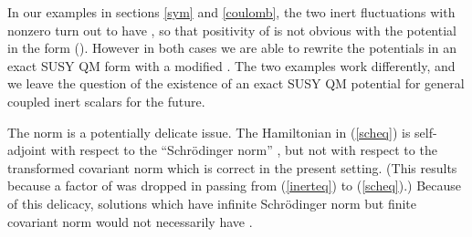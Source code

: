 \documentclass[a4paper,12pt]{article}
\begin{document}
In our examples in sections \ref{sym} and
\ref{coulomb}, the two inert fluctuations with nonzero \coordHE{}
turn out to have \coordHE{}, so that positivity of \coordHE{} is
not obvious with the potential in the form (\myHighlight{$\ref{schpot}$}\coordHE{}).  However
in both cases we are able to rewrite the potentials in an exact SUSY
QM form with a modified \coordHE{}.  The two examples work
differently, and we leave the question of the existence of an exact
SUSY QM potential for general coupled inert scalars for the future.

The norm is a potentially delicate issue.  The Hamiltonian in
(\ref{scheq}) is self-adjoint with respect to the ``Schr\"odinger
norm'' \coordHE{}, but not with respect to the transformed
covariant norm \coordHE{} which is correct in
the present setting.  (This results because a factor of \coordHE{}
was dropped in passing from (\ref{inerteq}) to (\ref{scheq}).)
Because of this delicacy, solutions which have infinite Schr\"odinger
norm but finite covariant norm would not necessarily have \coordHE{}. 
\end{document}
